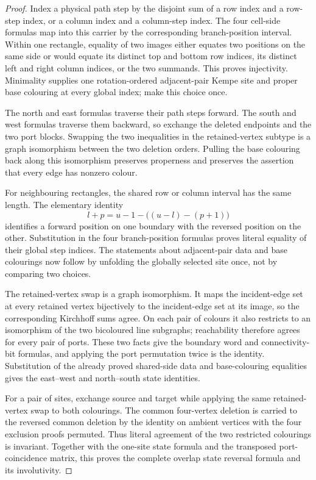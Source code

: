 \begin{proof}
Index a physical path step by the disjoint sum of a row index and a row-step
index, or a column index and a column-step index.  The four cell-side formulas
map into this carrier by the corresponding branch-position interval.  Within
one rectangle, equality of two images either equates two positions on the
same side or would equate its distinct top and bottom row indices, its
distinct left and right column indices, or the two summands.  This proves
injectivity.  Minimality supplies one rotation-ordered adjacent-pair Kempe
site and proper base colouring at every global index; make this choice once.

The north and east formulas traverse their path steps forward.  The south and
west formulas traverse them backward, so exchange the deleted endpoints and
the two port blocks.  Swapping the two inequalities in the retained-vertex
subtype is a graph isomorphism between the two deletion orders.  Pulling the
base colouring back along this isomorphism preserves properness and preserves
the assertion that every edge has nonzero colour.

For neighbouring rectangles, the shared row or column interval has the same
length.  The elementary identity
\[
  l+p=u-1-\bigl((u-l)-(p+1)\bigr)
\]
identifies a forward position on one boundary with the reversed position on
the other.  Substitution in the four branch-position formulas proves literal
equality of their global step indices.  The statements about adjacent-pair
data and base colourings now follow by unfolding the globally selected site
once, not by comparing two choices.

The retained-vertex swap is a graph isomorphism.  It maps the incident-edge
set at every retained vertex bijectively to the incident-edge set at its image,
so the corresponding Kirchhoff sums agree.  On each pair of colours it also
restricts to an isomorphism of the two bicoloured line subgraphs; reachability
therefore agrees for every pair of ports.  These two facts give the boundary
word and connectivity-bit formulas, and applying the port permutation twice
is the identity.  Substitution of the already proved shared-side data and
base-colouring equalities gives the east--west and north--south state
identities.

For a pair of sites, exchange source and target while applying the same
retained-vertex swap to both colourings.  The common four-vertex deletion is
carried to the reversed common deletion by the identity on ambient vertices
with the four exclusion proofs permuted.  Thus literal agreement of the two
restricted colourings is invariant.  Together with the one-site state formula
and the transposed port-coincidence matrix, this proves the complete overlap
state reversal formula and its involutivity.


\end{proof}
